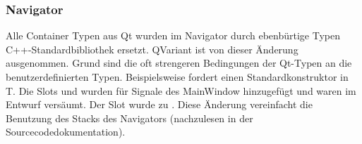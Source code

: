 \subsubsection{Navigator}
Alle Container Typen aus Qt wurden im Navigator durch ebenbürtige Typen C++-Standardbibliothek ersetzt. QVariant ist von dieser Änderung ausgenommen. Grund sind die oft strengeren Bedingungen der Qt-Typen an die benutzerdefinierten Typen. Beispielsweise fordert  einen Standardkonstruktor in T.
Die Slots  und  wurden für Signale des MainWindow hinzugefügt und waren im Entwurf versäumt.
Der Slot  wurde zu . Diese Änderung vereinfacht die Benutzung des Stacks des Navigators (nachzulesen in der Sourcecodedokumentation).
